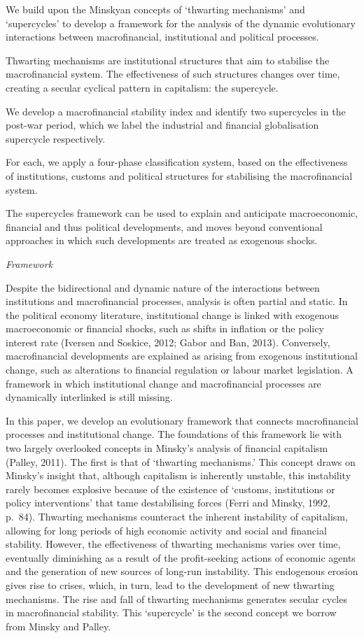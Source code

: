 \documentclass[
]{book}
\begin{document}
We build upon the Minskyan concepts of `thwarting mechanisms' and `supercycles' to
develop a framework for the analysis of
the dynamic evolutionary interactions between
macrofinancial, institutional and political processes.

Thwarting mechanisms are institutional structures that aim to
stabilise the macrofinancial system.
The effectiveness of such structures changes over time,
creating a secular cyclical pattern in capitalism: the supercycle.

We develop a macrofinancial stability index and identify two supercycles in the post-war period,
which we label the industrial and financial globalisation supercycle respectively.

For each, we apply a four-phase classification system, based on the
effectiveness of institutions, customs and political structures
for stabilising the macrofinancial system.

The supercycles framework can be used to explain and anticipate
macroeconomic, financial and thus political developments, and
moves beyond conventional approaches in which such developments are
treated as exogenous shocks.

\emph{Framework}

Despite the bidirectional and dynamic nature of the interactions between institutions and macrofinancial
processes, analysis is often partial and static. In the political economy literature, institutional change is
linked with exogenous macroeconomic or financial shocks, such as shifts in inflation or the policy
interest rate (Iversen and Soskice, 2012; Gabor and Ban, 2013). Conversely, macrofinancial
developments are explained as arising from exogenous institutional change, such as alterations to
financial regulation or labour market legislation. A framework in which institutional change and
macrofinancial processes are dynamically interlinked is still missing.

In this paper, we develop an evolutionary framework that connects macrofinancial processes and
institutional change. The foundations of this framework lie with two largely overlooked concepts in
Minsky's analysis of financial capitalism (Palley, 2011). The first is that of `thwarting mechanisms.'
This concept draws on Minsky's insight that, although capitalism is inherently unstable, this instability
rarely becomes explosive because of the existence of `customs, institutions or policy interventions' that
tame destabilising forces (Ferri and Minsky, 1992, p.~84). Thwarting mechanisms counteract the
inherent instability of capitalism, allowing for long periods of high economic activity and social and
financial stability.
However, the effectiveness of thwarting mechanisms varies over time, eventually diminishing as a
result of the profit-seeking actions of economic agents and the generation of new sources of long-run
instability. This endogenous erosion gives rise to crises, which, in turn, lead to the development of new
thwarting mechanisms. The rise and fall of thwarting mechanisms generates secular cycles in
macrofinancial stability. This `supercycle' is the second concept we borrow from Minsky and Palley.
\end{document}
